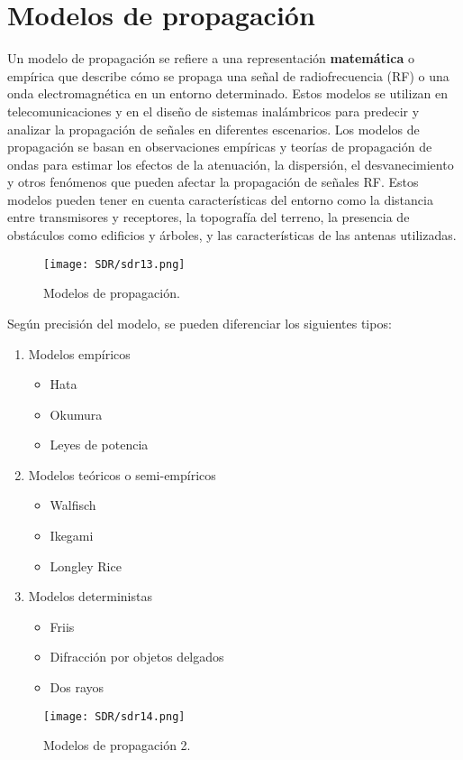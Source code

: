 \documentclass[
	12pt, %
	fleqn, %
	a4paper, %
	oneside, %
]{LegrandOrangeBook}
\begin{document}
\section{Modelos de propagación}
Un modelo de propagación se refiere a una representación \textbf{matemática} o empírica que describe cómo se propaga una señal de radiofrecuencia (RF) o una onda electromagnética en un entorno determinado. Estos modelos se utilizan en telecomunicaciones y en el diseño de sistemas inalámbricos para predecir y analizar la propagación de señales en diferentes escenarios. Los modelos de propagación se basan en observaciones empíricas y teorías de propagación de ondas para estimar los efectos de la atenuación, la dispersión, el desvanecimiento y otros fenómenos que pueden afectar la propagación de señales RF. Estos modelos pueden tener en cuenta características del entorno como la distancia entre transmisores y receptores, la topografía del terreno, la presencia de obstáculos como edificios y árboles, y las características de las antenas utilizadas.
\begin{figure}[H]
\centering
\texttt{[image: SDR/sdr13.png]}
\caption{Modelos de propagación.}
\end{figure}
Según precisión del modelo, se pueden diferenciar los siguientes tipos:
\begin{enumerate}
\item Modelos empíricos
\begin{itemize}
\item Hata
\item Okumura
\item Leyes de potencia
\end{itemize}
\item Modelos teóricos o semi-empíricos
\begin{itemize}
\item Walfisch
\item Ikegami
\item Longley Rice
\end{itemize}
\item Modelos deterministas
\begin{itemize}
\item Friis
\item Difracción por objetos delgados
\item Dos rayos
\end{itemize}
\end{enumerate}
\begin{figure}[H]
\centering
\texttt{[image: SDR/sdr14.png]}
\caption{Modelos de propagación 2.}
\end{figure}
\end{document}
